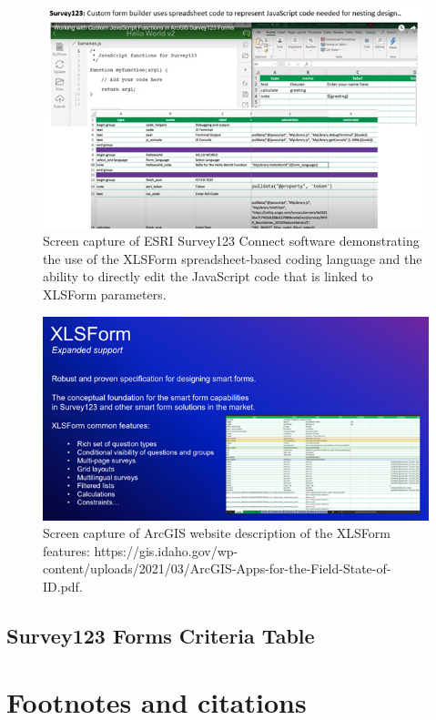 \documentclass[
]{book}
\theoremstyle{definition}
\theoremstyle{definition}
\theoremstyle{definition}
\theoremstyle{definition}
\theoremstyle{remark}
\begin{document}
\begin{figure}
\includegraphics[width=0.9\linewidth]{figures/survey123/survey123_xlsform} \caption{Screen capture of ESRI Survey123 Connect software demonstrating the use of the XLSForm spreadsheet-based coding language and the ability to directly edit the JavaScript code that is linked to XLSForm parameters.}\label{fig:xlsform}
\end{figure}

\begin{figure}
\includegraphics[width=0.9\linewidth]{figures/survey123/survey123_xlsform2} \caption{Screen capture of ArcGIS website description of the XLSForm features: https://gis.idaho.gov/wp-content/uploads/2021/03/ArcGIS-Apps-for-the-Field-State-of-ID.pdf.}\label{fig:xlsform2}
\end{figure}

\hypertarget{survey123-forms-criteria-table}{%
\section{Survey123 Forms Criteria Table}\label{survey123-forms-criteria-table}}

\hypertarget{footnotes-and-citations}{%
\chapter{Footnotes and citations}\label{footnotes-and-citations}}
\end{document}
